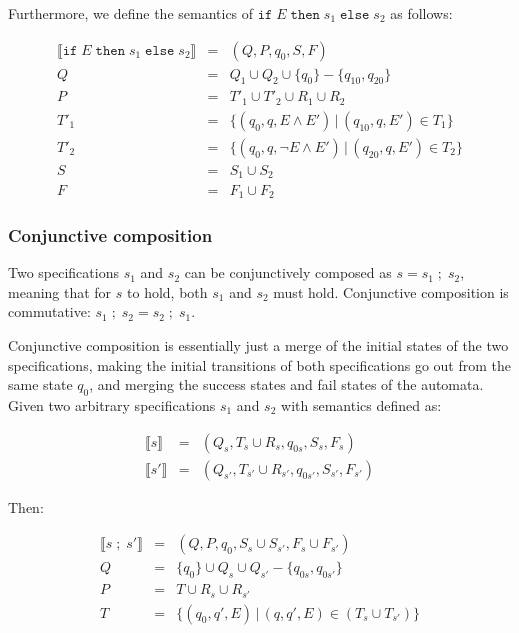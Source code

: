 Furthermore, we define the semantics of $\texttt{if} \; E \; \texttt{then} \;
s_1 \; \texttt{else} \; s_2$ as follows:

\medskip
\[
  \begin{array}{rcl}
  \llbracket \texttt{if} \; E \; \texttt{then} \; s_1 \; \texttt{else} \; s_2 \rrbracket & = & (Q, P, q_0, S, F) \\
           Q & = & Q_1 \cup Q_2 \cup \{q_0\} - \{q_{10}, q_{20}\} \\
           P & = & T'_1 \cup T'_2 \cup R_1 \cup R_2 \\
        T'_1 & = & \{(q_0, q, E       \wedge E') \, | \, (q_{10}, q, E') \in T_1\} \\
        T'_2 & = & \{(q_0, q, \neg E \wedge E') \, | \, (q_{20}, q, E') \in T_2\} \\
           S & = & S_1 \cup S_2 \\
           F & = & F_1 \cup F_2
  \end{array}
\]
\medskip




\subsubsection{Conjunctive composition}

Two specifications $s_1$ and $s_2$ can be conjunctively composed as $s = s_1 \;
; \; s_2$, meaning that for $s$ to hold, both $s_1$ and $s_2$ must hold.
Conjunctive composition is commutative: $s_1 \; ; \; s_2 = s_2 \; ; \; s_1$.

Conjunctive composition is essentially just a merge of the initial states of
the two specifications, making the initial transitions of both specifications
go out from the same state $q_0$, and merging the success states and fail
states of the automata. Given two arbitrary specifications $s_1$ and $s_2$ with
semantics defined as:

\medskip
\[
  \begin{array}{rcl}
    \llbracket s \rrbracket & = & (Q_s, T_s \cup R_s, q_{0s}, S_s, F_s) \\
   \llbracket s' \rrbracket & = & (Q_{s'}, T_{s'} \cup R_{s'}, q_{0s'}, S_{s'}, F_{s'})
  \end{array}
\]
\medskip

Then:

\medskip
\[
  \begin{array}{rcl}
    \llbracket s \; ; \; s' \rrbracket & = & (Q, P, q_0, S_s \cup S_{s'}, F_s \cup F_{s'}) \\
                       Q & = & \{q_0\} \cup Q_s \cup Q_{s'} - \{q_{0s}, q_{0s'}\} \\
                       P & = & T \cup R_s \cup R_{s'} \\
                       T & = & \{(q_0, q', E) \, | \, (q, q', E) \in (T_s \cup T_{s'})\} \\
  \end{array}
\]
\medskip

